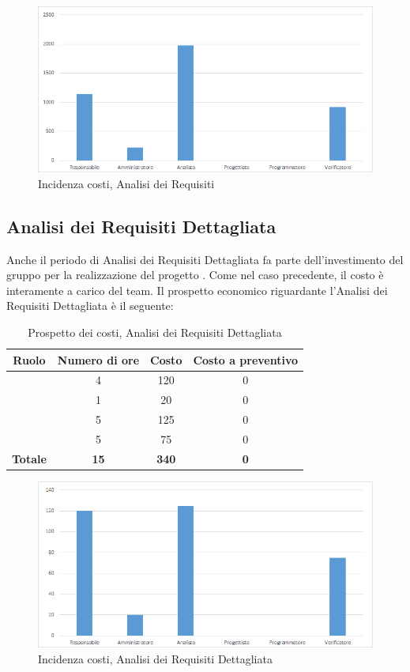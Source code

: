 \begin{figure}[H]
	\centering
	\includegraphics[scale=0.6]{img/8-1.png}
	\caption{Incidenza costi, Analisi dei Requisiti}
\end{figure}

\subsection{Analisi dei Requisiti Dettagliata}
Anche il periodo di Analisi dei Requisiti Dettagliata fa parte dell'investimento del gruppo \textit{\gruppo} per la realizzazione del progetto \progetto. Come nel caso precedente, il costo è interamente a carico del team. Il prospetto economico riguardante l'Analisi dei Requisiti Dettagliata è il seguente:


\begin{table}[H]
	\begin{center}
		\begin{tabular}{|c|c|c|c|}
			\hline
			\textbf{Ruolo}	& \textbf{Numero di ore} & \textbf{Costo} & \textbf{Costo a preventivo}\\
			\hline
			\Res	&	4  &	120 &  0	\\
			\hline
			\Amm	&	1  &	20 &  0	\\
			\hline
			\Ana	&	5  &	125 &  0	\\
			\hline
			\Ver	&	5  &	75	&  0	\\
			\hline
			\textbf{Totale}  &	\textbf{15}	&  \textbf{340}	 &  \textbf{0}	\\
			\hline
		\end{tabular}
	\end{center}
	\caption{Prospetto dei costi, Analisi dei Requisiti Dettagliata }
\end{table}

\begin{figure}[H]
	\centering
	\includegraphics[scale=0.6]{img/8-1a.png}
	\caption{Incidenza costi, Analisi dei Requisiti Dettagliata}
\end{figure}

